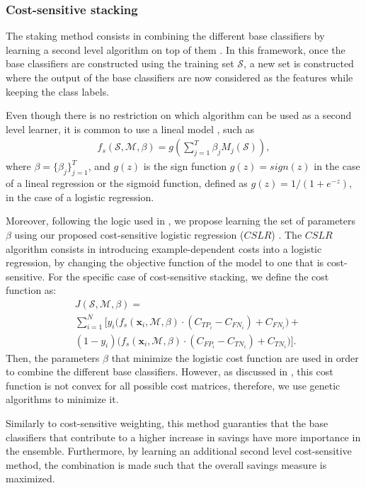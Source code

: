 {\subsubsection{Cost-sensitive stacking}

The staking method consists in combining the different base classifiers by learning a 
second level algorithm on top of them \citep{Wolpert1992}. In this framework, once the base 
classifiers are constructed using the training set  $\mathcal{S}$, a new set is constructed 
where the output of the base classifiers  are now considered as the features while keeping the 
class labels.

Even though there is no restriction on which algorithm can be used as a second level learner, 
it is common to use a lineal model \citep{Zhou2012}, such as 
\begin{align}
  f_s(\mathcal{S},\mathcal{M},\beta) =
  g \left( \sum_{j=1}^T \beta_j M_j(\mathcal{S}) \right),
\end{align}
where $\beta=\{\beta_j\}_{j=1}^T$, and $g(z)$ is the sign function 
\mbox{$g(z)=sign(z)$} in the case of a lineal regression or the sigmoid function, defined 
as \mbox{$g(z)=1/(1+e^{-z})$}, in the case of a logistic regression. 

Moreover, following the logic used in \citep{Nesbitt2010}, we propose learning the set of  
parameters $\beta$  using our proposed cost-sensitive logistic regression ($CSLR$) 
\citep{CorreaBahnsen2014b}. The $CSLR$ algorithm consists in introducing example-dependent costs 
into a logistic regression, by changing the objective function of the model to one that is 
cost-sensitive. For the specific case of cost-sensitive stacking, we define the cost function as: 
\begin{align}
  &J(\mathcal{S},\mathcal{M},\beta)= \nonumber \\
  & \sum_{i=1}^{N} \bigg[ y_i\bigg( 
  f_s(\mathbf{x}_i,\mathcal{M},\beta) \cdot(C_{TP_i} - C_{FN_i}) + C_{FN_i} \bigg) + 
  \nonumber \\
  & (1-y_i)\bigg( f_s(\mathbf{x}_i,\mathcal{M},\beta) \cdot(C_{FP_i} - C_{TN_i}) 
    +C_{TN_i} \bigg) \bigg].
\end{align}
Then, the parameters $\beta$ that minimize the logistic cost function are used in order to 
combine the different base classifiers. However, as discussed in \citep{CorreaBahnsen2014b}, 
this cost function is not convex for all possible cost matrices, therefore, we use genetic 
algorithms to minimize it.

Similarly to cost-sensitive weighting, this method guaranties that the base classifiers that 
contribute to a higher increase in savings have more importance in the ensemble. Furthermore, 
by learning an additional second level cost-sensitive method, the combination is made such that 
the overall   savings measure is maximized.


}
